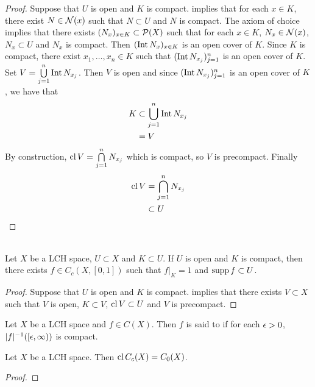 \documentclass{book}
\begin{document}
\begin{proof}
	Suppose that $U$ is open and $K$ is compact.  implies that for each $x \in K$, there exist $N \in \mathcal{N}(x)$ such that $N \subset U$ and $N$ is compact. The axiom of choice implies that there exists $(N_x)_{x \in K} \subset \mathcal{P}(X)$ such that for each $x \in K$, $N_x \in \mathcal{N}(x)$, $N_x \subset U$ and $N_x$ is compact. Then $(\operatorname{Int} N_x)_{x \in K}$ is an open cover of $K$. Since $K$ is compact, there exist $x_1, \ldots, x_n \in K$ such that $(\operatorname{Int} N_{x_j})_{j=1}^n$ is an open cover of $K$. Set $V = \bigcup\limits_{j=1}^n \operatorname{Int} N_{x_j}$. Then $V$ is open and since $(\operatorname{Int} N_{x_j})_{j=1}^n$ is an open cover of $K$, we have that 
	\begin{align*}
		K
		& \subset \bigcup_{j=1}^n \operatorname{Int} N_{x_j} \\
		& = V \\
	\end{align*}
	By construction, $\operatorname{cl} V = \bigcap\limits_{j=1}^n N_{x_j}$ which is compact, so $V$ is precompact. Finally
	\begin{align*}
		\operatorname{cl} V
		& = \bigcap_{j=1}^n N_{x_j} \\
		& \subset U
	\end{align*}
\end{proof}

\begin{ex}  \\
	Let $X$ be a LCH space, $U \subset X$ and $K \subset U$. If $U$ is open and $K$ is compact, then there exists $f \in C_c(X, [0,1])$ such that $f|_K = 1$ and $\operatorname{supp} f \subset U$.
\end{ex}

\begin{proof}
	Suppose that $U$ is open and $K$ is compact.  implies that there exists $V \subset X$ such that $V$ is open, $K \subset V$, $\operatorname{cl} V \subset U$ and $V$ is precompact. 
\end{proof}

\begin{defn}
	Let $X$ be a LCH space and $f \in C(X)$. Then $f$ is said to  if for each $\epsilon >0$, $|f|^{-1}([\epsilon, \infty))$ is compact.
\end{defn}

\begin{ex} 
	Let $X$ be a LCH space. Then $\operatorname{cl} C_c(X) = C_0(X)$. 
\end{ex}

\begin{proof}
\end{proof}
\end{document}

